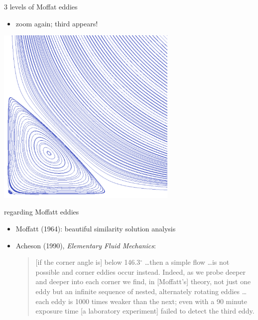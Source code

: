 \documentclass[hide notes,intlimits,usenames,dvipsnames]{beamer}
\begin{document}
\begin{frame}{3 levels of Moffat eddies}

\begin{itemize}
\item zoom again; third appears!
\end{itemize}

\begin{center}
\includegraphics[width=0.65\textwidth]{lidbox-streamlines-zoom2}
\end{center}
\end{frame}


\begin{frame}{regarding Moffatt eddies}

\begin{itemize}
\item Moffatt (1964): beautiful similarity solution analysis
\item Acheson (1990), \emph{Elementary Fluid Mechanics}:
    \begin{quote}
    [if the corner angle is] below 146.3$^\circ$ \dots then a simple flow \dots is not possible and corner eddies occur instead.  Indeed, as we probe deeper and deeper into each corner we find, in [Moffatt's] theory, not just one eddy but an infinite sequence of nested, alternately rotating eddies \dots each eddy is 1000 times weaker than the next; even with a 90 minute exposure time [a laboratory experiment] failed to detect the third eddy.
    \end{quote}
\end{itemize}
\end{frame}
\end{document}
